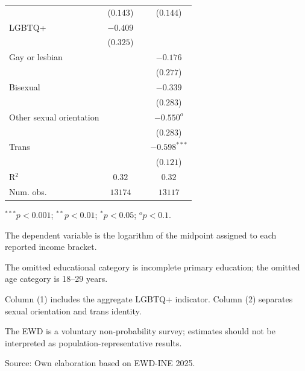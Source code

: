 \begin{table}[H]
\begin{center}
\begin{threeparttable}
\begin{tabular}{lccc}
 & ($0.143$) & & ($0.144$) \\ 
LGBTQ+ & $-0.409$ & &  \\ 
 & ($0.325$) & &  \\ 
Gay or lesbian &  & & $-0.176$ \\ 
 &  & & ($0.277$) \\ 
Bisexual &  & & $-0.339$ \\ 
 &  & & ($0.283$) \\ 
Other sexual orientation &  & & $-0.550^{o}$ \\ 
 &  & & ($0.283$) \\ 
Trans &  & & $-0.598^{***}$ \\ 
 &  & & ($0.121$) \\ 
R$^2$ & $0.32$ & & $0.32$ \\ 
Num. obs. & $13174$ & & $13117$ \\ \bottomrule
\end{tabular}
\begin{tablenotes}
\item ${}^{***}p<0.001$; ${}^{**}p<0.01$; ${}^{*}p<0.05$; ${}^{o}p<0.1$.
\item The dependent variable is the logarithm of the midpoint assigned to each reported income bracket.
\item The omitted educational category is incomplete primary education; the omitted age category is 18--29 years.
\item Column (1) includes the aggregate LGBTQ+ indicator. Column (2) separates sexual orientation and trans identity.
\item The EWD is a voluntary non-probability survey; estimates should not be interpreted as population-representative results.
\item Source: Own elaboration based on EWD-INE 2025.
\end{tablenotes}
\end{threeparttable}
\end{center}
\end{table}